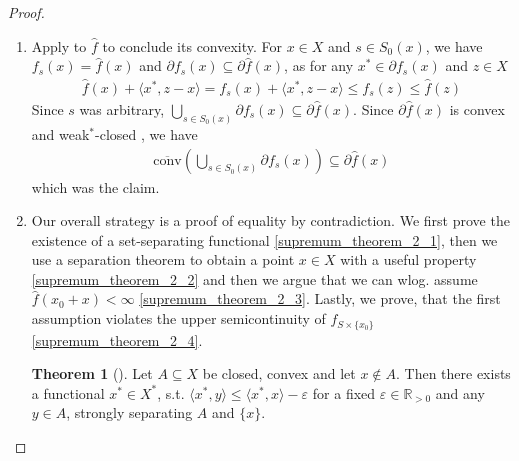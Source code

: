 \documentclass[10pt, leqno]{amsart}
\theoremstyle{definition}
\newtheorem{theorem}{Theorem}[section]
\theoremstyle{remark}
\newcommand{\draftcommentdone}{}
\begin{document}
    \begin{proof}
        \begin{enumerate}[label=(\roman*), wide]
            \item[\ref{supremum_theorem_1}] \draftcommentdone Apply  to \(\hat{f}\) to conclude its convexity. For \(x \in X\) and \(s \in S_0(x)\), we have \(f_s(x) = \hat{f}(x)\) and \(\partial f_s(x) \subseteq \partial \hat{f}(x)\), as for any \(x^* \in \partial f_s(x)\) and \(z \in X\)
            \begin{align}
                \hat{f}(x) + \langle x^*, z-x \rangle = f_s(x) + \langle x^*, z-x \rangle \leq f_s(z) \leq \hat{f}(z)
            \end{align}
            Since \(s\) was arbitrary, \(\bigcup_{s \in S_0(x)} \partial f_s(x) \subseteq \partial \hat{f}(x)\). Since \(\partial \hat{f}(x)\) is convex and weak\({}^*\)-closed \cite[p. 198]{IoffeTihomirov}, we have
            \begin{align}
                \overline{\text{conv}}\left(\bigcup_{s \in S_0(x)} \partial f_s(x)\right) \subseteq \partial \hat{f}(x)
            \end{align}
            which was the claim.
            \item[\ref{supremum_theorem_2}] \draftcommentdone Our overall strategy is a proof of equality by contradiction. We first prove the existence of a set-separating functional \ref{supremum_theorem_2_1}, then we use a separation theorem to obtain a point \(x \in X\) with a useful property \ref{supremum_theorem_2_2} and then we argue that we can wlog. assume \(\hat{f}(x_0 + x) < \infty\) \ref{supremum_theorem_2_3}. Lastly, we prove, that the first assumption violates the upper semicontinuity of \(f_{S \times \{x_0\}}\) \ref{supremum_theorem_2_4}.
            
            \begin{edgebox}
                \begin{theorem}[{\cite[pp. 164-165]{IoffeTihomirov}}] \label{separation_theorem}
                    Let \(A \subseteq X\) be closed, convex and let \(x \notin A\). Then there exists a functional \(x^* \in X^*\), s.t. \(\langle x^*, y\rangle \leq \langle x^*, x \rangle - \varepsilon\) for a fixed \(\varepsilon \in \mathbb{R}_{> 0}\) and any \(y \in A\), strongly separating \(A\) and \(\{x\}\).
                \end{theorem}
            \end{edgebox}


\end{enumerate}
\end{proof}
\end{document}
